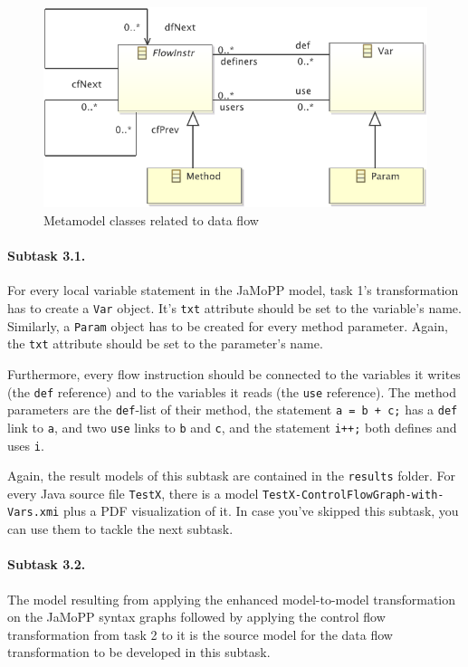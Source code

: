 \documentclass[11pt]{article}
\begin{document}
\begin{figure}[h!]
  \centering
  \includegraphics[width=0.6\linewidth]{../metamodel/DataFlowGraph}
  \caption{Metamodel classes related to data flow}
  \label{fig:data-flow-mm}
\end{figure}

\paragraph{Subtask 3.1.}
\label{sec:subtask-3.1}

For every local variable statement in the JaMoPP model, task 1's transformation
has to create a \verb|Var| object.  It's \verb|txt| attribute should be set to
the variable's name.  Similarly, a \verb|Param| object has to be created for
every method parameter.  Again, the \verb|txt| attribute should be set to the
parameter's name.

Furthermore, every flow instruction should be connected to the variables it
writes (the \verb|def| reference) and to the variables it reads (the \verb|use|
reference).  The method parameters are the \verb|def|-list of their method, the
statement \verb|a = b + c;| has a \verb|def| link to \verb|a|, and two
\verb|use| links to \verb|b| and \verb|c|, and the statement \verb|i++;| both
defines and uses \verb|i|.

Again, the result models of this subtask are contained in the \verb|results|
folder.  For every Java source file \verb|TestX|, there is a model
\verb|TestX-ControlFlowGraph-with-Vars.xmi| plus a PDF visualization of it.  In
case you've skipped this subtask, you can use them to tackle the next subtask.

\paragraph{Subtask 3.2.}
\label{sec:subtask-3.2}

The model resulting from applying the enhanced model-to-model transformation on
the JaMoPP syntax graphs followed by applying the control flow transformation
from task 2 to it is the source model for the data flow transformation to be
developed in this subtask.
\end{document}
